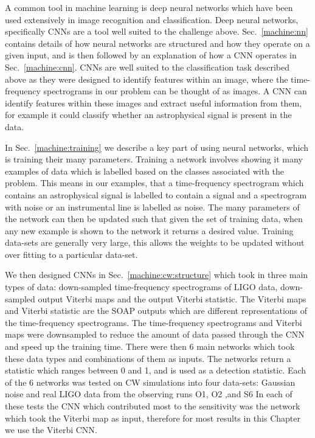 A common tool in machine learning is deep neural networks which have been used extensively in image recognition and classification.
Deep neural networks, specifically \glspl{CNN} are a tool well suited to the challenge above.
Sec.~\ref{machine:nn} contains details of how neural networks are structured and how they operate on a given input, and is then followed by an explanation of how a \gls{CNN} operates in Sec.~\ref{machine:cnn}.
\glspl{CNN} are well suited to the classification task described above as they were designed to identify features within an image, where the time-frequency spectrograms in our problem can be thought of as images.
A \gls{CNN} can identify features within these images and extract useful information from them, for example it could classify whether an astrophysical signal is present in the data.

In Sec.~\ref{machine:training} we describe a key part of using neural networks, which is training their many parameters.
Training a network involves showing it many examples of data which is labelled based on the classes associated with the problem.
This means in our examples, that a time-frequency spectrogram which contains an astrophysical signal is labelled to contain a signal and a spectrogram with noise or an instrumental line is labelled as noise.
The many parameters of the network can then be updated such that given the set of training data, when any new example is shown to the network it returns a desired value.
Training data-sets are generally very large, this allows the weights to be updated without over fitting to a particular data-set. 

We then designed \glspl{CNN} in Sec.~\ref{machine:cw:structure} which took in three main types of data: down-sampled time-frequency spectrograms of \gls{LIGO} data, down-sampled output Viterbi maps and the output Viterbi statistic.
The Viterbi maps and Viterbi statistic are the SOAP outputs which are different representations of the time-frequency spectrograms.
The time-frequency spectrograms and Viterbi maps were downsampled to reduce the amount of data passed through the \gls{CNN} and speed up the training time.
There were then 6 main networks which took these data types and combinations of them as inputs. 
The networks return a statistic which ranges between 0 and 1, and is used as a detection statistic. 
Each of the 6 networks was tested on \gls{CW} simulations into four data-sets: Gaussian noise and real \gls{LIGO} data from the observing runs O1, O2 ,and S6
In each of these tests the \gls{CNN} which contributed most to the sensitivity was the network which took the Viterbi map as input, therefore for most results in this Chapter we use the Viterbi \gls{CNN}. 

